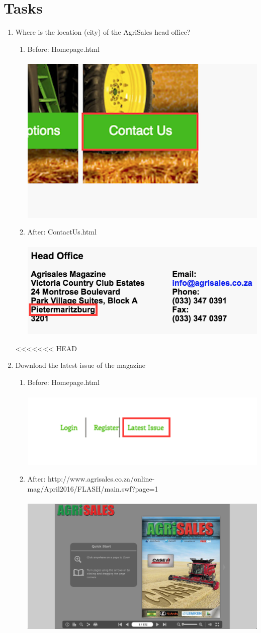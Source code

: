 \documentclass[11pt]{article}
\begin{document}
\section{Tasks}
	\begin{enumerate}
		\item Where is the location (city) of the AgriSales head office?
				\begin{enumerate}
					\item Before: Homepage.html \\ \\
						\includegraphics[width=0.3\linewidth]{../Images/Tasks/Task1Before}
					\item After: ContactUs.html \\ \\
						\includegraphics[width=0.5\linewidth]{../Images/Tasks/Task1After}
				\end{enumerate}
<<<<<<< HEAD
		\item Download the latest issue of the magazine
			\begin{enumerate}
				\item Before: Homepage.html \\ \\
					\includegraphics[width=0.7\linewidth]{../Images/Tasks/Task2Before}
				\item After: http://www.agrisales.co.za/online-mag/April2016/FLASH/main.swf?page=1 \\ \\
					\includegraphics[width=0.5\linewidth]{../Images/Tasks/Task2After}

\end{enumerate}
\end{enumerate}
\end{document}

